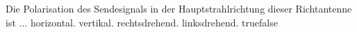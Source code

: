     {Die Polarisation des Sendesignals in der Hauptstrahlrichtung dieser Richtantenne ist ...}
    {horizontal.}
    {vertikal.}
    {rechtsdrehend.}
    {linksdrehend.}
    {true}{false}